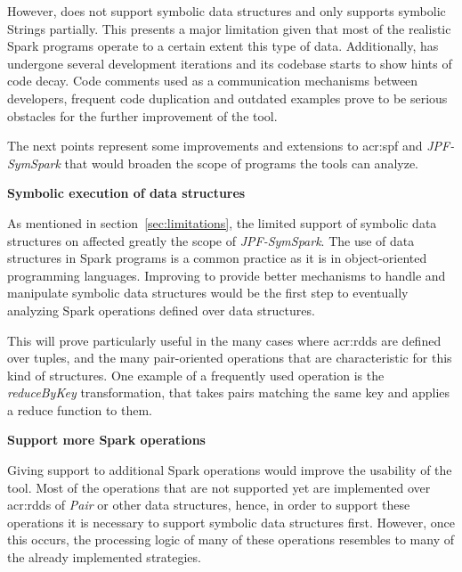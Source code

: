 \begin{enumerate}
	However, \spf{} does not support symbolic data structures and only supports symbolic Strings partially. This presents a major limitation given that most of the realistic Spark programs operate to a certain extent this type of data. Additionally, \spf{} has undergone several development iterations and its codebase starts to show hints of code decay. Code comments used as a communication mechanisms between developers, frequent code duplication and outdated examples prove to be serious obstacles for the further improvement of the tool.
	
\end{enumerate}

\label{sec:future}


The next points represent some improvements and extensions to \acrlong{acr:spf} and \textit{JPF-SymSpark} that would broaden the scope of programs the tools can analyze.

\textbf{Symbolic execution of data structures}

As mentioned in section~\ref{sec:limitations}, the limited support of symbolic data structures on \spf{} affected greatly the scope of \textit{JPF-SymSpark}. The use of data structures in Spark programs is a common practice as it is in object-oriented programming languages. Improving \spf{} to provide better mechanisms to handle and manipulate symbolic data structures would be the first step to eventually analyzing Spark operations defined over data structures.

This will prove particularly useful in the many cases where \acrshort{acr:rdd}s are defined over tuples, and the many pair-oriented operations that are characteristic for this kind of structures. One example of a frequently used operation is the \textit{reduceByKey} transformation, that takes pairs matching the same key and applies a reduce function to them.

\textbf{Support more Spark operations}

Giving support to additional Spark operations would improve the usability of the tool. Most of the operations that are not supported yet are implemented over \acrshort{acr:rdd}s of \textit{Pair} or other data structures, hence, in order to support these operations it is necessary to support symbolic data structures first. However, once this occurs, the processing logic of many of these operations resembles to many of the already implemented strategies.

